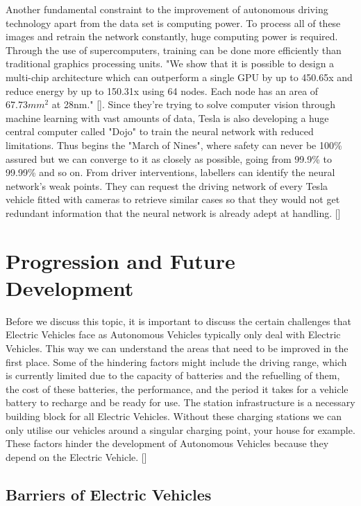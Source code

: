 \documentclass{article}
\begin{document}
Another fundamental constraint to the improvement of autonomous driving technology apart from the data set is computing power. To process all of these images and retrain the network constantly, huge computing power is required. Through the use of supercomputers, training can be done more efficiently than traditional graphics processing units. "We show that it is possible to design a multi-chip architecture which can outperform a single GPU by up to 450.65x and reduce energy by up to 150.31x using 64 nodes. Each node has an area of $67.73mm^2$ at 28nm." [\textcite{chen2014dadiannao}]. Since they're trying to solve computer vision through machine learning with vast amounts of data, Tesla is also developing a huge central computer called "Dojo" to train the neural network with reduced limitations. Thus begins the "March of Nines", where safety can never be 100\% assured but we can converge to it as closely as possible, going from 99.9\% to 99.99\% and so on. From driver interventions, labellers can identify the neural network's weak points. They can request the driving network of every Tesla vehicle fitted with cameras to retrieve similar cases so that they would not get redundant information that the neural network is already adept at handling. [\textcite{autonomyday}]

\section{Progression and Future Development}

Before we discuss this topic, it is important to discuss the certain challenges that Electric Vehicles face as Autonomous Vehicles typically only deal with Electric Vehicles. This way we can understand the areas that need to be improved in the first place. Some of the hindering factors might include the driving range, which is currently limited due to the capacity of batteries and the refuelling of them, the cost of these batteries, the performance, and the period it takes for a vehicle battery to recharge and be ready for use. The station infrastructure is a necessary building block for all Electric Vehicles. Without these charging stations we can only utilise our vehicles around a singular charging point, your house for example. These factors hinder the development of Autonomous Vehicles because they depend on the Electric Vehicle. [\textcite{bimbraw2015autonomous}]

\subsection{Barriers of Electric Vehicles}
\end{document}
